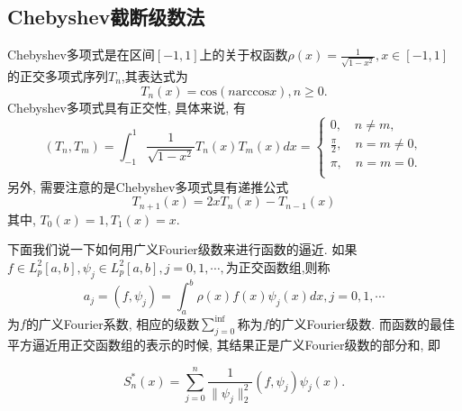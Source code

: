 \documentclass[a4paper]{article}
\begin{document}
\begin{spacing}{1.5}
\begin{CJK*}{GBK}{song}
\subsection{Chebyshev截断级数法}
Chebyshev多项式是在区间$[-1, 1]$上的关于权函数$\rho(x)=\frac{1}{\sqrt{1-x^2}}, x\in [-1,1]$的正交多项式序列$T_n$,其表达式为
\begin{equation}
T_n(x)=\text{cos}(n\text{arccos}x), n\geqslant 0.
\end{equation}
Chebyshev多项式具有正交性, 具体来说, 有
\begin{equation}
(T_n, T_m)=\int_{-1}^1 \frac{1}{\sqrt{1-x^2}}T_n(x)T_m(x)dx=
\left\{
\begin{array}{lll}
0, \quad n \neq m, \\
\frac{\pi}{2}, \quad n=m\neq 0,\\
\pi, \quad n=m=0. \\
\end{array}
 \right.
\end{equation}
另外, 需要注意的是Chebyshev多项式具有递推公式
\begin{equation}\label{ditui}
T_{n+1}(x)=2xT_{n}(x)-T_{n-1}(x)
\end{equation}
其中, $T_0(x)=1, T_1(x)=x$. \par


下面我们说一下如何用广义Fourier级数来进行函数的逼近. 如果$f \in L_p^2[a,b],  \psi_j \in L_p^2[a,b], j=0,1,\cdots,$为正交函数组,则称
\begin{equation}\label{a_chev}
a_j=(f, \psi_j)=\int_a^b\rho(x)f(x)\psi_j(x)dx, j=0,1,\cdots
\end{equation}
为$f$的广义Fourier系数, 相应的级数$\sum_{j=0}^{\inf}$称为$f$的广义Fourier级数. 而函数的最佳平方逼近用正交函数组的表示的时候, 其结果正是广义Fourier级数的部分和, 即

\begin{equation}\label{cheb}
S_n^*(x)=\sum^n_{j=0}\frac{1}{\parallel \psi_j\parallel_2^2}(f,\psi_j)\psi_j(x).
\end{equation}


\end{CJK*}
\end{spacing}
\end{document}
